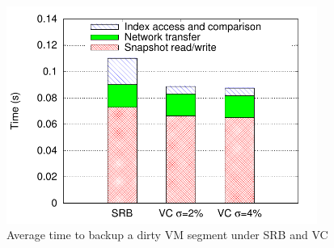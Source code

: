 \begin{figure}[htbp]
  \centering
  \includegraphics[width=4in]{figures/vc_srb_combined}
  \caption{Average time to backup a dirty VM segment under SRB and VC}
  \label{fig:vc_srb_combined}
\end{figure}





